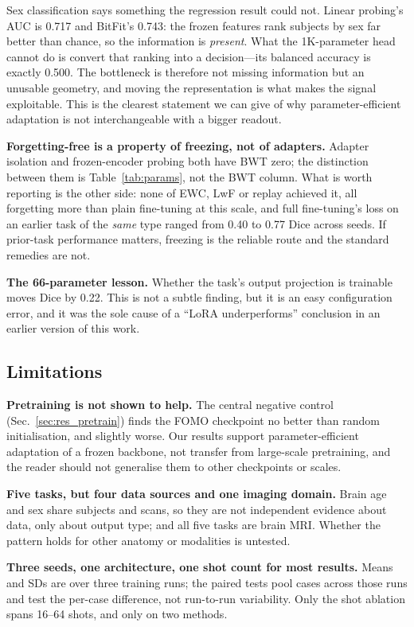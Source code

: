 \documentclass[journal,twoside,web]{ieeecolor}
\begin{document}
Sex classification says something the regression result could not. Linear probing's AUC is 0.717 and BitFit's 0.743: the frozen features rank subjects by sex far better than chance, so the information is \emph{present}. What the 1K-parameter head cannot do is convert that ranking into a decision---its balanced accuracy is exactly 0.500. The bottleneck is therefore not missing information but an unusable geometry, and moving the representation is what makes the signal exploitable. This is the clearest statement we can give of why parameter-efficient adaptation is not interchangeable with a bigger readout.

\textbf{Forgetting-free is a property of freezing, not of adapters.} Adapter isolation and frozen-encoder probing both have BWT zero; the distinction between them is Table~\ref{tab:params}, not the BWT column. What is worth reporting is the other side: none of EWC, LwF or replay achieved it, all forgetting more than plain fine-tuning at this scale, and full fine-tuning's loss on an earlier task of the \emph{same} type ranged from 0.40 to 0.77 Dice across seeds. If prior-task performance matters, freezing is the reliable route and the standard remedies are not.

\textbf{The 66-parameter lesson.} Whether the task's output projection is trainable moves Dice by 0.22. This is not a subtle finding, but it is an easy configuration error, and it was the sole cause of a ``LoRA underperforms'' conclusion in an earlier version of this work.

\subsection{Limitations}
\label{sec:limitations}

\textbf{Pretraining is not shown to help.} The central negative control (Sec.~\ref{sec:res_pretrain}) finds the FOMO checkpoint no better than random initialisation, and slightly worse. Our results support parameter-efficient adaptation of a frozen backbone, not transfer from large-scale pretraining, and the reader should not generalise them to other checkpoints or scales.

\textbf{Five tasks, but four data sources and one imaging domain.} Brain age and sex share subjects and scans, so they are not independent evidence about data, only about output type; and all five tasks are brain MRI. Whether the pattern holds for other anatomy or modalities is untested.

\textbf{Three seeds, one architecture, one shot count for most results.} Means and SDs are over three training runs; the paired tests pool cases across those runs and test the per-case difference, not run-to-run variability. Only the shot ablation spans 16--64 shots, and only on two methods.
\end{document}
